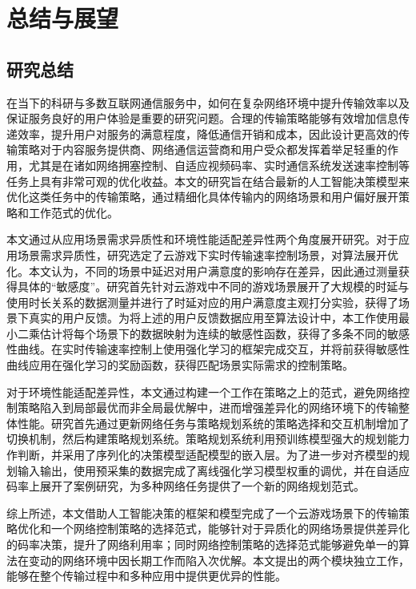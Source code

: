 
\chapter{总结与展望}
\section{研究总结}
在当下的科研与多数互联网通信服务中，如何在复杂网络环境中提升传输效率以及保证服务良好的用户体验是重要的研究问题。合理的传输策略能够有效增加信息传递效率，提升用户对服务的满意程度，降低通信开销和成本，因此设计更高效的传输策略对于内容服务提供商、网络通信运营商和用户受众都发挥着举足轻重的作用，尤其是在诸如网络拥塞控制、自适应视频码率、实时通信系统发送速率控制等任务上具有非常可观的优化收益。本文的研究旨在结合最新的人工智能决策模型来优化这类任务中的传输策略，通过精细化具体传输内的网络场景和用户偏好展开策略和工作范式的优化。

本文通过从应用场景需求异质性和环境性能适配差异性两个角度展开研究。对于应用场景需求异质性，研究选定了云游戏下实时传输速率控制场景，对算法展开优化。本文认为，不同的场景中延迟对用户满意度的影响存在差异，因此通过测量获得具体的“敏感度”。研究首先针对云游戏中不同的游戏场景展开了大规模的时延与使用时长关系的数据测量并进行了时延对应的用户满意度主观打分实验，获得了场景下真实的用户反馈。为将上述的用户反馈数据应用至算法设计中，本工作使用最小二乘估计将每个场景下的数据映射为连续的敏感性函数，获得了多条不同的敏感性曲线。在实时传输速率控制上使用强化学习的框架完成交互，并将前获得敏感性曲线应用在强化学习的奖励函数，获得匹配场景实际需求的控制策略。

对于环境性能适配差异性，本文通过构建一个工作在策略之上的范式，避免网络控制策略陷入到局部最优而非全局最优解中，进而增强差异化的网络环境下的传输整体性能。研究首先通过更新网络任务与策略规划系统的策略选择和交互机制增加了切换机制，然后构建策略规划系统。策略规划系统利用预训练模型强大的规划能力作判断，并采用了序列化的决策模型适配模型的嵌入层。为了进一步对齐模型的规划输入输出，使用预采集的数据完成了离线强化学习模型权重的调优，并在自适应码率上展开了案例研究，为多种网络任务提供了一个新的网络规划范式。

综上所述，本文借助人工智能决策的框架和模型完成了一个云游戏场景下的传输策略优化和一个网络控制策略的选择范式，能够针对于异质化的网络场景提供差异化的码率决策，提升了网络利用率；同时网络控制策略的选择范式能够避免单一的算法在变动的网络环境中因长期工作而陷入次优解。本文提出的两个模块独立工作，能够在整个传输过程中和多种应用中提供更优异的性能。

